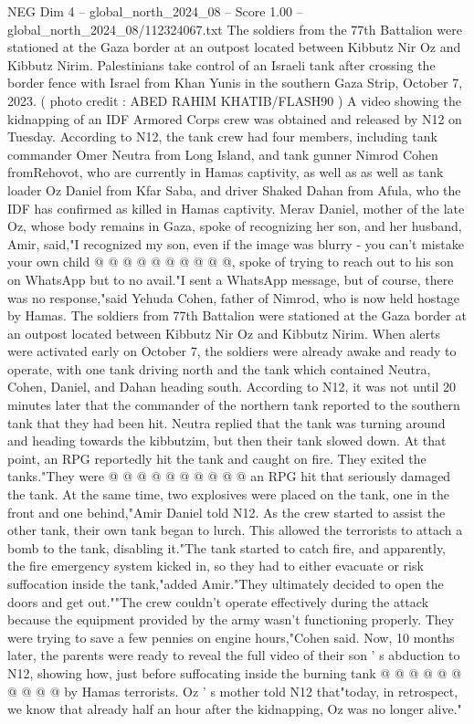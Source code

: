 \begin{textsample}{NEG Dim 4 – global\_north\_2024\_08 – Score 1.00 – global\_north\_2024\_08/112324067.txt}  \label{ex:f4_neg_303}
The soldiers from the 77th Battalion were stationed at the Gaza border at an outpost located between Kibbutz Nir Oz and Kibbutz Nirim.
Palestinians take control of an Israeli tank after crossing the border fence with Israel from Khan Yunis in the southern Gaza Strip, October 7, 2023. ( photo credit : ABED RAHIM KHATIB/FLASH90 ) A video showing the kidnapping of an IDF Armored Corps crew was obtained and released by N12 on Tuesday.
According to N12, the tank crew had four members, including tank commander Omer Neutra from Long Island, and tank gunner Nimrod Cohen fromRehovot, who are currently in Hamas captivity, as well as as well as tank loader Oz Daniel from Kfar Saba, and driver Shaked Dahan from Afula, who the IDF has confirmed as killed in Hamas captivity.
Merav Daniel, mother of the late Oz, whose body remains in Gaza, spoke of recognizing her son, and her husband, Amir, said,"I recognized my son, even if the image was blurry - you can't mistake your own child @ @ @ @ @ @ @ @ @ @, spoke of trying to reach out to his son on WhatsApp but to no avail."I sent a WhatsApp message, but of course, there was no response,"said Yehuda Cohen, father of Nimrod, who is now held hostage by Hamas.
The soldiers from 77th Battalion were stationed at the Gaza border at an outpost located between Kibbutz Nir Oz and Kibbutz Nirim.
When alerts were activated early on October 7, the soldiers were already awake and ready to operate, with one tank driving north and the tank which contained Neutra, Cohen, Daniel, and Dahan heading south.
According to N12, it was not until 20 minutes later that the commander of the northern tank reported to the southern tank that they had been hit.
Neutra replied that the tank was turning around and heading towards the kibbutzim, but then their tank slowed down.
At that point, an RPG reportedly hit the tank and caught on fire.
They exited the tanks."They were @ @ @ @ @ @ @ @ @ @ an RPG hit that seriously damaged the tank.
At the same time, two explosives were placed on the tank, one in the front and one behind,"Amir Daniel told N12.
As the crew started to assist the other tank, their own tank began to lurch.
This allowed the terrorists to attach a bomb to the tank, disabling it."The tank started to catch fire, and apparently, the fire emergency system kicked in, so they had to either evacuate or risk suffocation inside the tank,"added Amir."They ultimately decided to open the doors and get out.""The crew couldn't operate effectively during the attack because the equipment provided by the army wasn't functioning properly.
They were trying to save a few pennies on engine hours,"Cohen said.
Now, 10 months later, the parents were ready to reveal the full video of their son ' s abduction to N12, showing how, just before suffocating inside the burning tank @ @ @ @ @ @ @ @ @ @ by Hamas terrorists.
Oz ' s mother told N12 that"today, in retrospect, we know that already half an hour after the kidnapping, Oz was no longer alive."

\end{textsample}
